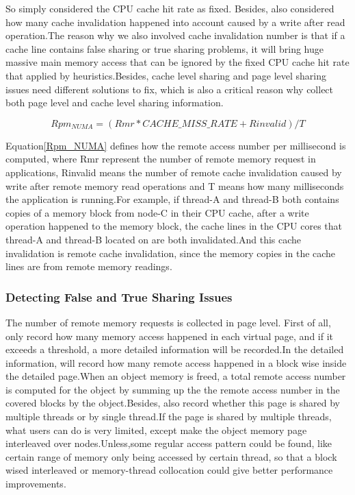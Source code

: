    

So \NP{} simply considered the CPU cache hit rate as fixed. Besides, \NP{} also considered how many cache invalidation happened into account caused by a write after read operation.The reason why we also involved cache invalidation number is that if a cache line contains false sharing or true sharing problems, it will bring huge massive main memory access that can be ignored by the fixed CPU cache hit rate that \NP{} applied by heuristics.Besides, cache level sharing and page level sharing issues need different solutions to fix, which is also a critical reason why \NP{} collect both page level and cache level sharing information.

\begin{equation}
Rpm_{NUMA} = (Rmr * CACHE\_MISS\_RATE + Rinvalid)/T \label{Rpm_NUMA}
\end{equation}

Equation\ref{Rpm_NUMA} defines how the remote access number per millisecond is computed, where Rmr represent the number of remote memory request in applications, Rinvalid means the number of remote cache invalidation caused by write after remote memory read operations and T means how many milliseconds the application is running.For example, if thread-A and thread-B both contains copies of a memory block from node-C in their CPU cache, after a write operation happened to the memory block, the cache lines in the CPU cores that thread-A and thread-B located on are both invalidated.And this cache invalidation is remote cache invalidation, since the memory copies in the cache lines are from remote memory readings.

\subsubsection{Detecting False and True Sharing Issues}
\label{sec: cacheline}

The number of remote memory requests is collected in page level. First of all, \NP{} only record how many memory access happened in each virtual page, and if it exceeds a threshold, a more detailed information will be recorded.In the detailed information, \NP{} will record how many remote access happened in a block wise inside the detailed page.When an object memory is freed, a total remote access number is computed for the object by summing up the the remote access number in the covered blocks by the object.Besides, \NP{} also record whether this page is shared by multiple threads or by single thread.If the page is shared by multiple threads, what users can do is very limited, except make the object memory page interleaved over nodes.Unless,some regular access pattern could be found, like certain range of memory only being accessed by certain thread, so that a block wised interleaved or memory-thread collocation could give better performance improvements.

